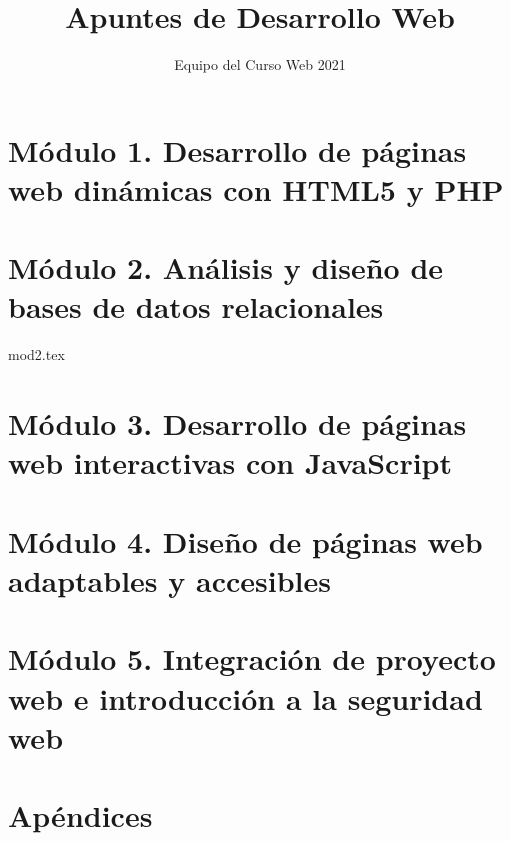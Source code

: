 \documentclass[12pt]{report}
\title{Apuntes de Desarrollo Web}
\author{Equipo del Curso Web 2021}
\begin{document}
	\maketitle
	\tableofcontents
	\chapter{Módulo 1. Desarrollo de páginas web dinámicas con HTML5 y PHP}
	\chapter{Módulo 2. Análisis y diseño de bases de datos relacionales}
		{mod2.tex}
	\chapter{Módulo 3. Desarrollo de páginas web interactivas con JavaScript}
	\chapter{Módulo 4. Diseño de páginas web adaptables y accesibles}
	\chapter{Módulo 5. Integración de proyecto web e introducción a la seguridad web}
	\appendix
	\chapter{Apéndices}
\end{document}
